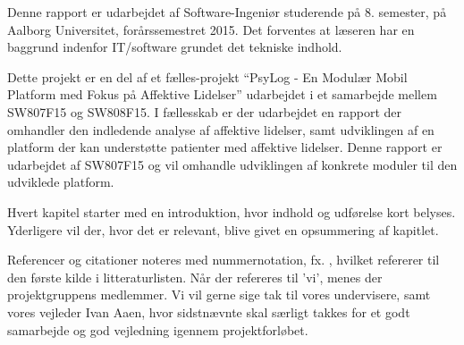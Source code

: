 Denne rapport er udarbejdet af Software-Ingeniør studerende på 8. semester, på Aalborg Universitet, forårssemestret 2015.
Det forventes at læseren har en baggrund indenfor IT/software grundet det tekniske indhold.

Dette projekt er en del af et fælles-projekt ``PsyLog - En Modulær Mobil Platform med Fokus på Affektive Lidelser''\cite{faelles} udarbejdet i et samarbejde mellem SW807F15 og SW808F15.
I fællesskab er der udarbejdet en rapport der omhandler den indledende analyse af affektive lidelser, samt udviklingen af en platform der kan understøtte patienter med affektive lidelser.
Denne rapport er udarbejdet af SW807F15 og vil omhandle udviklingen af konkrete moduler til den udviklede platform.

Hvert kapitel starter med en introduktion, hvor indhold og udførelse kort belyses.
Yderligere vil der, hvor det er relevant, blive givet en opsummering af kapitlet.

Referencer og citationer noteres med nummernotation, fx. \cite{faelles}, hvilket refererer til den første kilde i litteraturlisten.
Når der refereres til 'vi', menes der projektgruppens medlemmer.
\newline
\newline
Vi vil gerne sige tak til vores undervisere, samt vores vejleder Ivan Aaen, hvor sidstnævnte skal særligt takkes for et godt samarbejde og god vejledning igennem projektforløbet.
